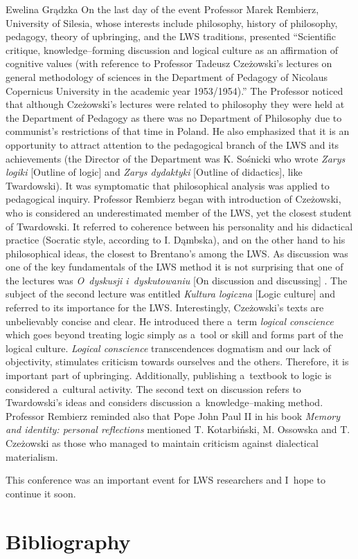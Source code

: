 \begin{editorialeng}{Ewelina Grądzka}
On the last day of the event Professor Marek Rembierz, University of Silesia, whose interests include philosophy, history of philosophy, pedagogy, theory of upbringing, and the LWS traditions, presented ``Scientific critique, knowledge--forming discussion and logical culture as an affirmation of cognitive values (with reference to Professor Tadeusz Czeżowski’s lectures on general methodology of sciences in the Department of Pedagogy of Nicolaus Copernicus University in the academic year 1953/1954).'' The Professor noticed that although Czeżowski’s lectures were related to philosophy they were held at the Department of Pedagogy as there was no Department of Philosophy due to communist’s restrictions of that time in Poland. He also emphasized that it is an opportunity to attract attention to the pedagogical branch of the LWS and its achievements (the Director of the Department was K. Sośnicki who wrote \textit{Zarys logiki} [Outline of logic] and \textit{Zarys dydaktyki} [Outline of didactics], like Twardowski). It was symptomatic that philosophical analysis was applied to pedagogical inquiry. Professor Rembierz began with introduction of Czeżowski, who is considered an underestimated member of the LWS, yet the closest student of Twardowski. It referred to coherence between his personality and his didactical practice (Socratic style, according to I. Dąmbska), and on the other hand to his philosophical ideas, the closest to Brentano’s among the LWS. As discussion was one of the key fundamentals of the LWS method it is not surprising that one of the lectures was \textit{O~dyskusji i~dyskutowaniu} [On discussion and discussing]
\parencite[][]{czezowski_o_1969}. %
 The subject of the second lecture was entitled \textit{Kultura logiczna} [Logic culture] 
\parencite[][]{czezowski_kultura_1969} %
 and referred to its importance for the LWS. Interestingly, Czeżowski’s texts are unbelievably concise and clear. He introduced there a~term \textit{logical conscience} which goes beyond treating logic simply as a~tool or skill and forms part of the logical culture. \textit{Logical conscience} transcendences dogmatism and our lack of objectivity, stimulates criticism towards ourselves and the others. Therefore, it is important part of upbringing. Additionally, publishing a~textbook to logic is considered a~cultural activity. The second text on discussion refers to Twardowski’s ideas and considers discussion a~knowledge--making method. Professor Rembierz reminded also that Pope John Paul II in his book \textit{Memory and identity: personal reflections} 
\parencite[][]{john_paul_ii_memory_2005} %
 mentioned T. Kotarbiński, M. Ossowska and T. Czeżowski as those who managed to maintain criticism against dialectical materialism.

This conference was an important event for LWS researchers and I~hope to continue it soon.

\section*{Bibliography}%
		\printbibliography[heading=none]\nopagebreak[4]

\end{editorialeng}
